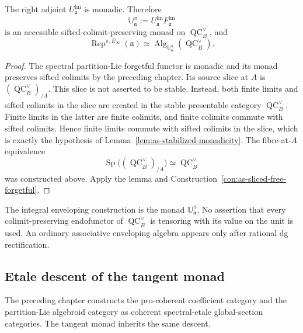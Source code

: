 \begin{theorem}
\label{thm:as-tangent-monadicity}
The right adjoint $U_{\mathfrak a}^{\mathrm{lin}}$ is monadic.  Therefore
\[
\boxed{
    \mathbb U_{\mathfrak a}^{\pi}
    :=
    U_{\mathfrak a}^{\mathrm{lin}}
    F_{\mathfrak a}^{\mathrm{lin}}
}
\]
is an accessible sifted-colimit-preserving monad on
$\operatorname{QC}^{\vee}_B$, and
\[
\boxed{
    \operatorname{Rep}^{\pi,E_\infty}(\mathfrak a)
    \simeq
    \operatorname{Alg}_{\mathbb U_{\mathfrak a}^{\pi}}
    \left(
        \operatorname{QC}^{\vee}_B
    \right).
}
\]
\end{theorem}

\begin{proof}
The spectral partition-Lie forgetful functor is monadic and its monad
preserves sifted colimits by the preceding chapter.  Its source slice at $A$
is $(\operatorname{QC}^{\vee}_B)_{/A}$.  This slice is not asserted to be
stable.  Instead, both finite limits and sifted colimits in the slice are
created in the stable presentable category $\operatorname{QC}^{\vee}_B$.
Finite limits in the latter are finite colimits, and finite colimits commute
with sifted colimits.  Hence finite limits commute with sifted colimits in the
slice, which is exactly the hypothesis of
Lemma~\ref{lem:as-stabilized-monadicity}.  The fibre-at-$A$ equivalence
\[
    \operatorname{Sp}\bigl((\operatorname{QC}^{\vee}_B)_{/A}\bigr)
    \simeq
    \operatorname{QC}^{\vee}_B
\]
was constructed above.  Apply the lemma and
Construction~\ref{con:as-sliced-free-forgetful}.
\end{proof}

\begin{remark}
The integral enveloping construction is the monad
$\mathbb U_{\mathfrak a}^{\pi}$.  No assertion that every colimit-preserving
endofunctor of $\operatorname{QC}_B^\vee$ is tensoring with its value on the
unit is used.  An ordinary associative enveloping algebra appears only after
rational dg rectification.
\end{remark}

\subsection{Etale descent of the tangent monad}

The preceding chapter constructs the pro-coherent coefficient category and
the partition-Lie algebroid category as coherent spectral-etale
global-section categories.  The tangent monad inherits the same descent.

